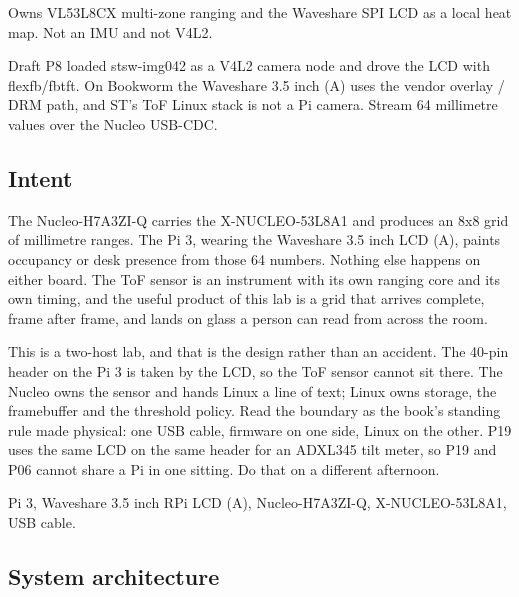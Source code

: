 
\begin{unique}
Owns VL53L8CX multi-zone ranging and the Waveshare SPI LCD as a local heat map.
Not an IMU and not V4L2.
\end{unique}

\begin{blueprint}
Draft P8 loaded stsw-img042 as a V4L2 camera node and drove the LCD with flexfb/fbtft.
On Bookworm the Waveshare 3.5 inch (A) uses the vendor overlay / DRM path, and ST's ToF
Linux stack is not a Pi camera. Stream 64 millimetre values over the Nucleo USB-CDC.
\end{blueprint}

\subsection*{Intent}

The Nucleo-H7A3ZI-Q carries the X-NUCLEO-53L8A1 and produces an 8x8 grid of millimetre
ranges. The Pi 3, wearing the Waveshare 3.5 inch LCD (A), paints occupancy or desk
presence from those 64 numbers. Nothing else happens on either board. The ToF sensor is
an instrument with its own ranging core and its own timing, and the useful product of
this lab is a grid that arrives complete, frame after frame, and lands on glass a person
can read from across the room.

This is a two-host lab, and that is the design rather than an accident. The 40-pin header
on the Pi 3 is taken by the LCD, so the ToF sensor cannot sit there. The Nucleo owns the
sensor and hands Linux a line of text; Linux owns storage, the framebuffer and the
threshold policy. Read the boundary as the book's standing rule made physical: one USB
cable, firmware on one side, Linux on the other. P19 uses the same LCD on the same header
for an ADXL345 tilt meter, so P19 and P06 cannot share a Pi in one sitting. Do that on a
different afternoon.

\begin{kit}
Pi 3, Waveshare 3.5 inch RPi LCD (A), Nucleo-H7A3ZI-Q, X-NUCLEO-53L8A1, USB cable.
\end{kit}

\subsection*{System architecture}

